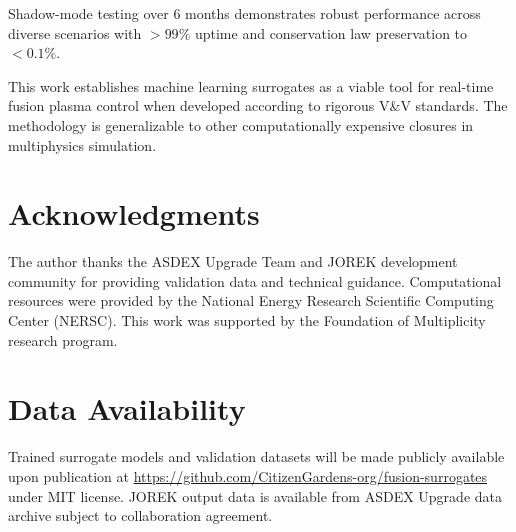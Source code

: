 \documentclass[12pt]{article}
\begin{document}
Shadow-mode testing over 6 months demonstrates robust performance across diverse scenarios with $> 99\%$ uptime and conservation law preservation to $< 0.1\%$.

This work establishes machine learning surrogates as a viable tool for real-time fusion plasma control when developed according to rigorous V\&V standards. The methodology is generalizable to other computationally expensive closures in multiphysics simulation.

\section*{Acknowledgments}

The author thanks the ASDEX Upgrade Team and JOREK development community for providing validation data and technical guidance. Computational resources were provided by the National Energy Research Scientific Computing Center (NERSC). This work was supported by the Foundation of Multiplicity research program.

\section*{Data Availability}

Trained surrogate models and validation datasets will be made publicly available upon publication at \url{https://github.com/CitizenGardens-org/fusion-surrogates} under MIT license. JOREK output data is available from ASDEX Upgrade data archive subject to collaboration agreement.
\end{document}

